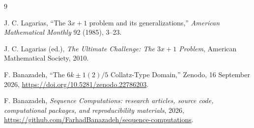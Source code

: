 \documentclass[11pt]{article}
\theoremstyle{definition}
\begin{document}
\begin{thebibliography}{9}

J. C. Lagarias,
``The $3x+1$ problem and its generalizations,''
\emph{American Mathematical Monthly} 92 (1985), 3--23.

J. C. Lagarias (ed.),
\emph{The Ultimate Challenge: The $3x+1$ Problem},
American Mathematical Society, 2010.

F. Banazadeh,
``The $6k\pm1(2)/5$ Collatz-Type Domain,''
Zenodo, 16 September 2026,
\url{https://doi.org/10.5281/zenodo.22786203}.

F. Banazadeh,
\emph{Sequence Computations: research articles, source code, computational packages, and reproducibility materials},
2026,
\url{https://github.com/FarhadBanazadeh/sequence-computations}.

\end{thebibliography}
\end{document}
